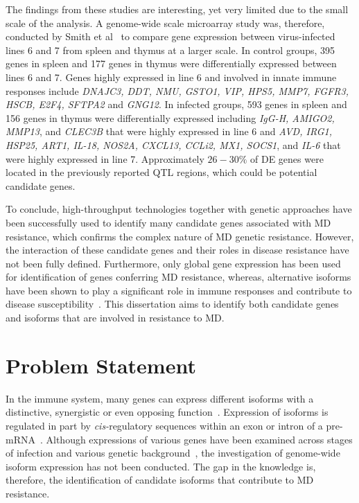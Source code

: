 The findings from these studies are interesting, yet very
limited due to the small scale of the analysis.  A
genome-wide scale microarray study was, therefore, conducted
by Smith et al~\cite{smith2011systems} to compare gene expression
between virus-infected lines 6 and 7 from spleen and thymus
at a larger scale.  In control groups, 395 genes in spleen
and 177 genes in thymus were differentially expressed
between lines 6 and 7.  Genes highly expressed in line 6 and
involved in innate immune responses include {\em DNAJC3,
DDT, NMU, GSTO1, VIP, HPS5, MMP7, FGFR3, HSCB, E2F4, SFTPA2}
and {\em GNG12}.  In infected groups, 593 genes in spleen
and 156 genes in thymus were differentially expressed
including {\em IgG-H, AMIGO2, MMP13}, and {\em CLEC3B} that
were highly expressed in line 6 and {\em AVD, IRG1, HSP25,
ART1, IL-18, NOS2A, CXCL13, CCLi2, MX1, SOCS1}, and {\em
IL-6} that were highly expressed in line 7.  Approximately
$26-30\%$ of DE genes were located in the previously reported QTL
regions, which could be potential candidate genes.

To conclude, high-throughput technologies together with
genetic approaches have been successfully used to identify
many candidate genes associated with MD resistance, which
confirms the complex nature of MD genetic resistance.
However, the interaction of these candidate genes and their
roles in disease resistance have not been fully defined.
Furthermore, only global gene expression has been used for
identification of genes conferring MD resistance, whereas,
alternative isoforms have been shown to play a significant
role in immune responses and contribute to disease
susceptibility~\cite{lynch2004consequences,wang2007splicing}.
This dissertation aims to identify both candidate genes and
isoforms that are involved in resistance to MD.

\section{Problem Statement}

In the immune system, many genes can express different
isoforms with a distinctive, synergistic or even opposing
function~\cite{lynch2004consequences,wang2007splicing}.
Expression of isoforms is regulated in part by {\em
cis-}regulatory sequences within an exon or intron of a
pre-mRNA~\cite{blencowe2000exonic}.  Although expressions of
various genes have been examined across stages of infection
and various genetic
background~\cite{smith2011systems,sarson2008transcriptional,kaiser2003differential,morgan2001induction},
the investigation of genome-wide isoform expression has not
been conducted.  The gap in the knowledge is, therefore, the
identification of candidate isoforms that contribute to MD
resistance.

